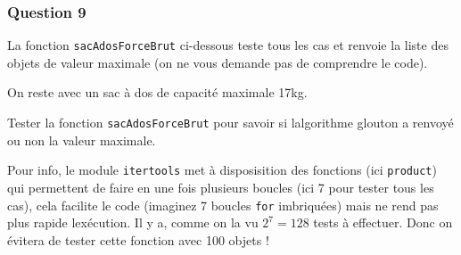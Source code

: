 \documentclass[
  paper=a4,
  ,captions=tableheading
]{scrartcl}
\begin{document}
\hypertarget{question-9}{%
\subsubsection{Question 9}\label{question-9}}

La fonction \texttt{sacAdosForceBrut} ci-dessous teste tous les cas et
renvoie la liste des objets de valeur maximale (on ne vous demande pas
de comprendre le code).

On reste avec un sac à dos de capacité maximale 17kg.

Tester la fonction \texttt{sacAdosForceBrut} pour savoir si
l\textquotesingle algorithme glouton a renvoyé ou non la valeur
maximale.

Pour info, le module \texttt{itertools} met à disposisition des
fonctions (ici \texttt{product}) qui permettent de faire en une fois
plusieurs boucles (ici 7 pour tester tous les cas), cela facilite le
code (imaginez 7 boucles \texttt{for} imbriquées) mais ne rend pas plus
rapide l\textquotesingle exécution. Il y a, comme on l\textquotesingle a
vu \(2^7=128\) tests à effectuer. Donc on évitera de tester cette
fonction avec 100 objets !
\end{document}
